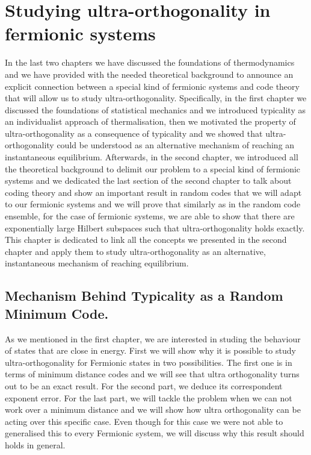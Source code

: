 \chapter{Studying ultra-orthogonality in fermionic systems}
In the last two chapters we have discussed the foundations of thermodynamics and we have provided with the needed theoretical background to announce an explicit connection between a special kind of fermionic systems and code theory that will allow us to study ultra-orthogonality. Specifically, in the first chapter we discussed the foundations of statistical mechanics and we introduced typicality as an individualist approach of thermalisation, then we motivated the property of ultra-orthogonality as a consequence of typicality and we showed that ultra-orthogonality could be understood as an alternative mechanism of reaching an instantaneous equilibrium. Afterwards, in the second chapter, we introduced all the theoretical background to delimit our problem to a special kind of fermionic systems and we dedicated the last section of the second chapter to talk about coding theory and show an important result in random codes that we will adapt to our fermionic systems and we will prove that similarly as in the random code ensemble, for the case of fermionic systems, we are able to show that there are exponentially large Hilbert subspaces such that ultra-orthogonality holds exactly. This chapter is dedicated to link all the concepts we presented in the second chapter and apply them to study ultra-orthogonality as an alternative, instantaneous mechanism of reaching equilibrium.
\section{Mechanism Behind Typicality as a Random Minimum Code.}
As we mentioned in the first chapter, we are interested in studing the behaviour of states that are close in energy. First we will show why it is possible to study ultra-orthogonality for Fermionic states in two possibilities. The first one is in terms of minimum distance codes and we will see that ultra orthogonality turns out to be an exact result. For the second part, we deduce its correspondent exponent error. For the last part, we will tackle the problem when we can not work over a minimum distance and we will show how ultra orthogonality can be acting over this specific case. Even though for this case we were not able to generalised this to every Fermionic system, we will discuss why this result should holds in general.

